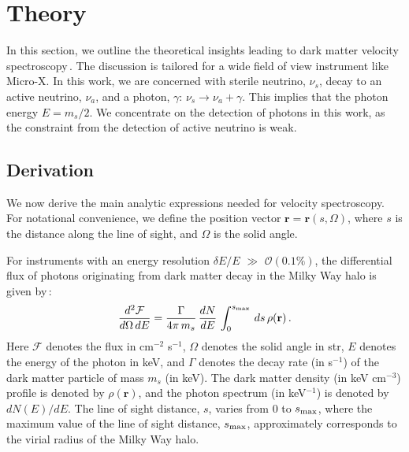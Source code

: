 \documentclass[aps,prd,10pt,twocolumn,superscriptaddress,showpacs,footinbib]{revtex4-1}
\newcommand{\br}[0]{\mathbf{r}}
\begin{document}

\section{Theory}
\label{sec:theory}

In this section, we outline the theoretical insights leading to dark matter velocity spectroscopy\,\cite{speckhard2016}.  
The discussion is tailored for a wide field of view instrument like Micro-X.  In this work, we are concerned with sterile neutrino, 
$\nu_s$, decay to an active neutrino, $\nu_a$, and a photon, $\gamma$: $\nu_s \rightarrow \nu_a + \gamma$.  
This implies that the photon energy $E = m_s/2$.  We concentrate on the detection of photons in this work, as the constraint from the detection of active neutrino is weak.

\subsection{Derivation}
\label{sec:derivation}

We now derive the main analytic expressions needed for velocity spectroscopy. For notational
convenience, we define the position vector $\br=\br(s, \Omega)$, where $s$ is the distance
along the line of sight, and $\Omega$ is the solid angle.

For instruments with an energy resolution $\delta E/E$ $\gg$ $\mathcal{O} (0.1\%)$, the differential flux of photons originating from dark matter decay in the Milky Way halo is given by\,\cite{Figueroa-Feliciano:2015gwa}:
\begin{eqnarray}
\dfrac{d^2 \mathcal{F}}{d\Omega \, dE} =  \dfrac{\Gamma}{4\pi \, m_s} \, \dfrac{dN}{dE} \, \int
_0 ^{s_{\rm max}}  \, ds \, \rho(\br)  \,.
\label{eq:double differential for the flux}
\end{eqnarray}
Here $\mathcal{F}$ denotes the flux in cm$^{-2}$ s$^{-1}$, $\Omega$ denotes the solid angle in str,
$E$ denotes the energy of the photon in keV, and $\Gamma$ denotes the decay rate (in s$^{-1}$) of
the dark matter particle of mass $m_s$ (in keV).  The dark matter density (in keV cm$^{-3}$) profile
is denoted by $\rho(\br)$, and the photon spectrum (in keV$^{-1}$) is denoted by $dN(E)/dE$.  The line of sight distance, $s$, varies from 0 to $s_{\rm max}$, where the maximum value of the line of sight distance, $s_{\rm max}$, approximately corresponds to the virial radius of the Milky Way halo.
\end{document}
